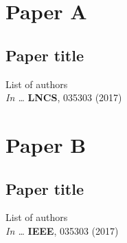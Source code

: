 
\chapter*{Paper A}
\section*{Paper title}

\noindent List of authors\\

\noindent \textit{In \Proc \IntlConf \ldots} \textbf{LNCS}, 035303 (2017)
\cleardoublepage



\chapter*{Paper B}
\section*{Paper title}

\noindent List of authors\\

\noindent \textit{In \Proc \IntlConf \ldots} \textbf{IEEE}, 035303 (2017)
\cleardoublepage





